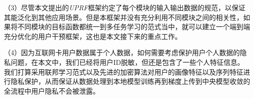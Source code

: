 （3）尽管本文提出的\emph{UPRF}框架约定了每个模块的输入输出数据的规范，以保证其能泛化到其他应用场景。但是本框架并没有充分利用不同模块之间的相关性，如果将不同模块的目标函数都统一到多任务学习的范式当中，就可以建立一个端到端充分优化的用户干预框架，这也是本文接下来的重点工作。 

（4）因为互联网卡用户数据属于个人数据，如何需要考虑保护用户个人数据的隐私问题，在本文中，我们已经将用户ID脱敏，但还是包含了一些个人特征信息。我们打算采用联邦学习范式以及先进的加密算法对用户的画像特征以及序列特征进行隐私保护，从而保证从数据处理到本地模型训练再到梯度上传到中央模型收敛的全流程中用户隐私不会被泄露。



